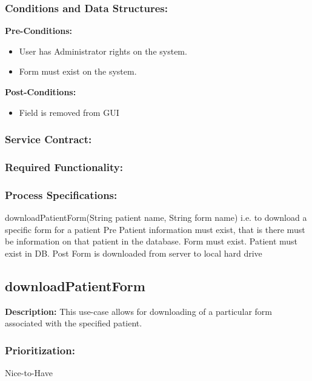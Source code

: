 \subsubsection{Conditions and Data Structures:}
\textbf{Pre-Conditions:}
\begin{itemize}
	\item User has Administrator rights on the system.
	\item Form must exist on the system.
\end{itemize}

\textbf{Post-Conditions:}	
\begin{itemize}
	\item Field is removed from GUI  
\end{itemize}
\subsubsection{Service Contract:} 
\subsubsection{Required Functionality:} 
\subsubsection{Process Specifications:} 




downloadPatientForm(String patient name,  String form name)
i.e. to download a specific form for a patient
Pre Patient information must exist, that is there must be information on that patient in the database.
	Form must exist.
	Patient must exist in DB.	
Post Form is downloaded from server to local hard drive

\subsection{downloadPatientForm} %
\textbf{Description:}
This use-case allows for downloading of a particular form associated with the specified patient.
\subsubsection{Prioritization:}
Nice-to-Have
